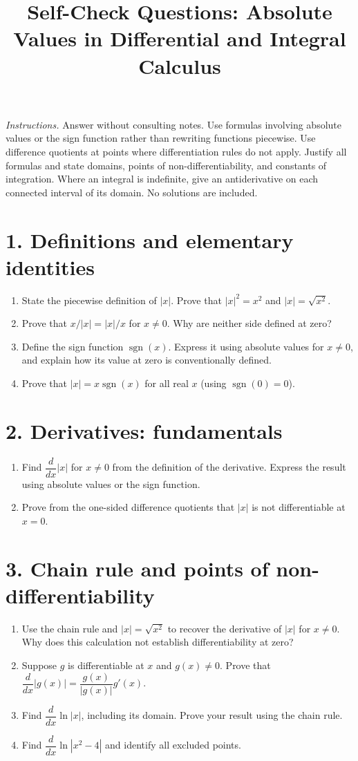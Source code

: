 \documentclass{self-check}
\title{Self-Check Questions: Absolute Values in Differential and Integral Calculus}
\author{}
\date{}
\begin{document}
\maketitle

\noindent\textit{Instructions.} Answer without consulting notes. Use formulas involving absolute values or the sign function rather than rewriting functions piecewise. Use difference quotients at points where differentiation rules do not apply. Justify all formulas and state domains, points of non-differentiability, and constants of integration. Where an integral is indefinite, give an antiderivative on each connected interval of its domain. No solutions are included.

\section*{1. Definitions and elementary identities}
\begin{enumerate}
\item State the piecewise definition of $|x|$. Prove that $|x|^2=x^2$ and $|x|=\sqrt{x^2}$.
\item Prove that $x/|x|=|x|/x$ for $x\ne0$. Why are neither side defined at zero?
\item Define the sign function $\operatorname{sgn}(x)$. Express it using absolute values for $x\ne0$, and explain how its value at zero is conventionally defined.
\item Prove that $|x|=x\operatorname{sgn}(x)$ for all real $x$ (using $\operatorname{sgn}(0)=0$).
\end{enumerate}

\section*{2. Derivatives: fundamentals}
\begin{enumerate}[resume]
\item Find $\dfrac{d}{dx}|x|$ for $x\ne0$ from the definition of the derivative. Express the result using absolute values or the sign function.
\item Prove from the one-sided difference quotients that $|x|$ is not differentiable at $x=0$.
\end{enumerate}

\section*{3. Chain rule and points of non-differentiability}
\begin{enumerate}[resume]
\item Use the chain rule and $|x|=\sqrt{x^2}$ to recover the derivative of $|x|$ for $x\ne0$. Why does this calculation not establish differentiability at zero?
\item Suppose $g$ is differentiable at $x$ and $g(x)\ne0$. Prove that $\dfrac{d}{dx}|g(x)|=\dfrac{g(x)}{|g(x)|}g'(x)$.
\item Find $\dfrac{d}{dx}\ln|x|$, including its domain. Prove your result using the chain rule.
\item Find $\dfrac{d}{dx}\ln|x^2-4|$ and identify all excluded points.
\end{enumerate}
\end{document}
